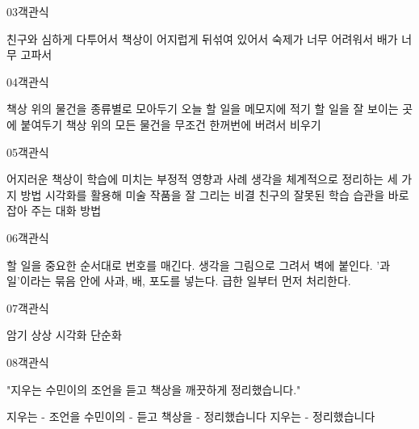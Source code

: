 \documentclass[fs11,seriesFre]{korfarm-base}
\begin{document}
\begin{kfQBlock}{03}{객관식}
\begin{kfChoices}
\kfChoice 친구와 심하게 다투어서
\kfChoice 책상이 어지럽게 뒤섞여 있어서
\kfChoice 숙제가 너무 어려워서
\kfChoice 배가 너무 고파서
\end{kfChoices}
\end{kfQBlock}

\begin{kfQBlock}{04}{객관식}
\begin{kfChoices}
\kfChoice 책상 위의 물건을 종류별로 모아두기
\kfChoice 오늘 할 일을 메모지에 적기
\kfChoice 할 일을 잘 보이는 곳에 붙여두기
\kfChoice 책상 위의 모든 물건을 무조건 한꺼번에 버려서 비우기
\end{kfChoices}
\end{kfQBlock}

\begin{kfQBlock}{05}{객관식}
\begin{kfChoices}
\kfChoice 어지러운 책상이 학습에 미치는 부정적 영향과 사례
\kfChoice 생각을 체계적으로 정리하는 세 가지 방법
\kfChoice 시각화를 활용해 미술 작품을 잘 그리는 비결
\kfChoice 친구의 잘못된 학습 습관을 바로잡아 주는 대화 방법
\end{kfChoices}
\end{kfQBlock}

\begin{kfQBlock}{06}{객관식}
\begin{kfChoices}
\kfChoice 할 일을 중요한 순서대로 번호를 매긴다.
\kfChoice 생각을 그림으로 그려서 벽에 붙인다.
\kfChoice '과일'이라는 묶음 안에 사과, 배, 포도를 넣는다.
\kfChoice 급한 일부터 먼저 처리한다.
\end{kfChoices}
\end{kfQBlock}

\begin{kfQBlock}{07}{객관식}
\begin{kfChoices}
\kfChoice 암기
\kfChoice 상상
\kfChoice 시각화
\kfChoice 단순화
\end{kfChoices}
\end{kfQBlock}

\begin{kfQBlock}{08}{객관식}
\begin{kfEvidence}"지우는 수민이의 조언을 듣고 책상을 깨끗하게 정리했습니다."\end{kfEvidence}
\begin{kfChoices}
\kfChoice 지우는 - 조언을
\kfChoice 수민이의 - 듣고
\kfChoice 책상을 - 정리했습니다
\kfChoice 지우는 - 정리했습니다
\end{kfChoices}
\end{kfQBlock}
\end{document}
